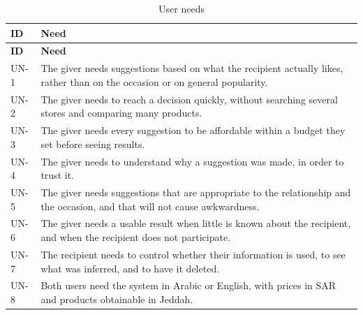 \documentclass[11pt,a4paper]{report}
\begin{document}
\begin{longtable}{@{}L{1.4cm}L{13.1cm}@{}}
\caption{User needs}\label{tab:needs}\\
\toprule \textbf{ID} & \textbf{Need} \\ \midrule
\endfirsthead
\toprule \textbf{ID} & \textbf{Need} \\ \midrule
\endhead
\bottomrule
\endfoot
UN-1 & The giver needs suggestions based on what the recipient actually likes, rather than on the occasion or on general popularity. \\
UN-2 & The giver needs to reach a decision quickly, without searching several stores and comparing many products. \\
UN-3 & The giver needs every suggestion to be affordable within a budget they set before seeing results. \\
UN-4 & The giver needs to understand why a suggestion was made, in order to trust it. \\
UN-5 & The giver needs suggestions that are appropriate to the relationship and the occasion, and that will not cause awkwardness. \\
UN-6 & The giver needs a usable result when little is known about the recipient, and when the recipient does not participate. \\
UN-7 & The recipient needs to control whether their information is used, to see what was inferred, and to have it deleted. \\
UN-8 & Both users need the system in Arabic or English, with prices in SAR and products obtainable in Jeddah. \\
\end{longtable}
\end{document}
